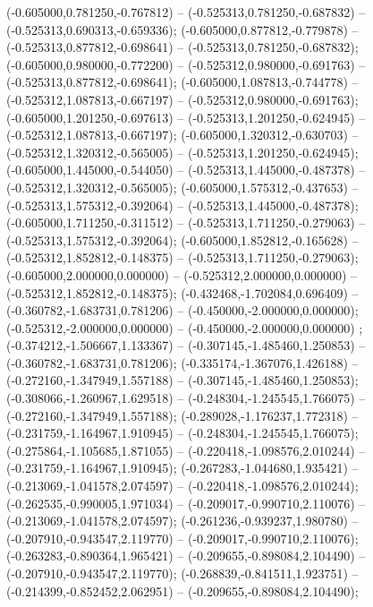  (-0.605000,0.781250,-0.767812) -- (-0.525313,0.781250,-0.687832) -- (-0.525313,0.690313,-0.659336);
 (-0.605000,0.877812,-0.779878) -- (-0.525313,0.877812,-0.698641) -- (-0.525313,0.781250,-0.687832);
 (-0.605000,0.980000,-0.772200) -- (-0.525312,0.980000,-0.691763) -- (-0.525313,0.877812,-0.698641);
 (-0.605000,1.087813,-0.744778) -- (-0.525312,1.087813,-0.667197) -- (-0.525312,0.980000,-0.691763);
 (-0.605000,1.201250,-0.697613) -- (-0.525313,1.201250,-0.624945) -- (-0.525312,1.087813,-0.667197);
 (-0.605000,1.320312,-0.630703) -- (-0.525312,1.320312,-0.565005) -- (-0.525313,1.201250,-0.624945);
 (-0.605000,1.445000,-0.544050) -- (-0.525313,1.445000,-0.487378) -- (-0.525312,1.320312,-0.565005);
 (-0.605000,1.575312,-0.437653) -- (-0.525313,1.575312,-0.392064) -- (-0.525313,1.445000,-0.487378);
 (-0.605000,1.711250,-0.311512) -- (-0.525313,1.711250,-0.279063) -- (-0.525313,1.575312,-0.392064);
 (-0.605000,1.852812,-0.165628) -- (-0.525312,1.852812,-0.148375) -- (-0.525313,1.711250,-0.279063);
 (-0.605000,2.000000,0.000000) -- (-0.525312,2.000000,0.000000) -- (-0.525312,1.852812,-0.148375);
 (-0.432468,-1.702084,0.696409) -- (-0.360782,-1.683731,0.781206) -- (-0.450000,-2.000000,0.000000);
 (-0.525312,-2.000000,0.000000) -- (-0.450000,-2.000000,0.000000) ;
 (-0.374212,-1.506667,1.133367) -- (-0.307145,-1.485460,1.250853) -- (-0.360782,-1.683731,0.781206);
 (-0.335174,-1.367076,1.426188) -- (-0.272160,-1.347949,1.557188) -- (-0.307145,-1.485460,1.250853);
 (-0.308066,-1.260967,1.629518) -- (-0.248304,-1.245545,1.766075) -- (-0.272160,-1.347949,1.557188);
 (-0.289028,-1.176237,1.772318) -- (-0.231759,-1.164967,1.910945) -- (-0.248304,-1.245545,1.766075);
 (-0.275864,-1.105685,1.871055) -- (-0.220418,-1.098576,2.010244) -- (-0.231759,-1.164967,1.910945);
 (-0.267283,-1.044680,1.935421) -- (-0.213069,-1.041578,2.074597) -- (-0.220418,-1.098576,2.010244);
 (-0.262535,-0.990005,1.971034) -- (-0.209017,-0.990710,2.110076) -- (-0.213069,-1.041578,2.074597);
 (-0.261236,-0.939237,1.980780) -- (-0.207910,-0.943547,2.119770) -- (-0.209017,-0.990710,2.110076);
 (-0.263283,-0.890364,1.965421) -- (-0.209655,-0.898084,2.104490) -- (-0.207910,-0.943547,2.119770);
 (-0.268839,-0.841511,1.923751) -- (-0.214399,-0.852452,2.062951) -- (-0.209655,-0.898084,2.104490);
